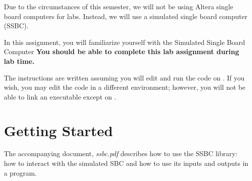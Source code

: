 

\usepackage{enumitem}
\usepackage{graphicx}
\usepackage{media9}
\usepackage{addfont}

\renewcommand{\labnumber}{9a}
\renewcommand{\labname}{Familiarization with Simulated Hardware}
\renewcommand{\shortlabname}{ssbclab-warmup}
\renewcommand{\collaborationrules}{\individualeffort}
\renewcommand{\duedate}{Week of April 12, before the start of your lab section}
\startdocument


Due to the circumstances of this semester, we will not be using Altera
single board computers for labs. Instead, we will use a simulated single
board computer (SSBC).

In this assignment, you will familiarize yourself with the Simulated Single Board Computer \textbf{You should be able to complete this
lab assignment during lab time.}

The instructions are written assuming you will edit and run the code on
\runtimeenvironment. If you wish, you may edit the code in a different
environment; however, you will not be able to link an executable except on
\runtimeenvironment.

\section{Getting Started}

The accompanying document, \textit{ssbc.pdf} describes how to use the SSBC
library: how to interact with the simulated SBC and how to use its inputs and
outputs in a program.

